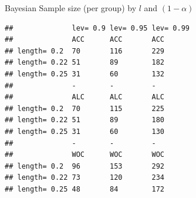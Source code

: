\documentclass{beamer}
\begin{document}
\begin{frame}[fragile]{Bayesian Sample size (per group) by \(l\) and
\((1-\alpha)\)}

\begin{verbatim}
##              lev= 0.9 lev= 0.95 lev= 0.99
##              ACC      ACC       ACC      
## length= 0.2  70       116       229      
## length= 0.22 51       89        182      
## length= 0.25 31       60        132      
##              -        -         -        
##              ALC      ALC       ALC      
## length= 0.2  70       115       225      
## length= 0.22 51       89        180      
## length= 0.25 31       60        130      
##              -        -         -        
##              WOC      WOC       WOC      
## length= 0.2  96       153       292      
## length= 0.22 73       120       234      
## length= 0.25 48       84        172
\end{verbatim}

\end{frame}
\end{document}
